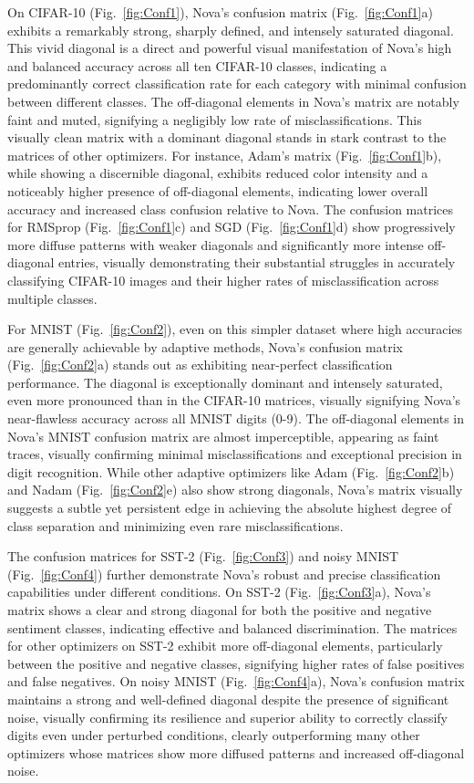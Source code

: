 \documentclass{article}
\begin{document}
On CIFAR-10 (Fig.~\ref{fig:Conf1}), Nova's confusion matrix (Fig.~\ref{fig:Conf1}a) exhibits a remarkably strong, sharply defined, and intensely saturated diagonal. This vivid diagonal is a direct and powerful visual manifestation of Nova's high and balanced accuracy across all ten CIFAR-10 classes, indicating a predominantly correct classification rate for each category with minimal confusion between different classes. The off-diagonal elements in Nova's matrix are notably faint and muted, signifying a negligibly low rate of misclassifications. This visually clean matrix with a dominant diagonal stands in stark contrast to the matrices of other optimizers. For instance, Adam's matrix (Fig.~\ref{fig:Conf1}b), while showing a discernible diagonal, exhibits reduced color intensity and a noticeably higher presence of off-diagonal elements, indicating lower overall accuracy and increased class confusion relative to Nova. The confusion matrices for RMSprop (Fig.~\ref{fig:Conf1}c) and SGD (Fig.~\ref{fig:Conf1}d) show progressively more diffuse patterns with weaker diagonals and significantly more intense off-diagonal entries, visually demonstrating their substantial struggles in accurately classifying CIFAR-10 images and their higher rates of misclassification across multiple classes.

For MNIST (Fig.~\ref{fig:Conf2}), even on this simpler dataset where high accuracies are generally achievable by adaptive methods, Nova's confusion matrix (Fig.~\ref{fig:Conf2}a) stands out as exhibiting near-perfect classification performance. The diagonal is exceptionally dominant and intensely saturated, even more pronounced than in the CIFAR-10 matrices, visually signifying Nova's near-flawless accuracy across all MNIST digits (0-9). The off-diagonal elements in Nova's MNIST confusion matrix are almost imperceptible, appearing as faint traces, visually confirming minimal misclassifications and exceptional precision in digit recognition. While other adaptive optimizers like Adam (Fig.~\ref{fig:Conf2}b) and Nadam (Fig.~\ref{fig:Conf2}e) also show strong diagonals, Nova's matrix visually suggests a subtle yet persistent edge in achieving the absolute highest degree of class separation and minimizing even rare misclassifications.

The confusion matrices for SST-2 (Fig.~\ref{fig:Conf3}) and noisy MNIST (Fig.~\ref{fig:Conf4}) further demonstrate Nova's robust and precise classification capabilities under different conditions. On SST-2 (Fig.~\ref{fig:Conf3}a), Nova's matrix shows a clear and strong diagonal for both the positive and negative sentiment classes, indicating effective and balanced discrimination. The matrices for other optimizers on SST-2 exhibit more off-diagonal elements, particularly between the positive and negative classes, signifying higher rates of false positives and false negatives. On noisy MNIST (Fig.~\ref{fig:Conf4}a), Nova's confusion matrix maintains a strong and well-defined diagonal despite the presence of significant noise, visually confirming its resilience and superior ability to correctly classify digits even under perturbed conditions, clearly outperforming many other optimizers whose matrices show more diffused patterns and increased off-diagonal noise.
\end{document}
